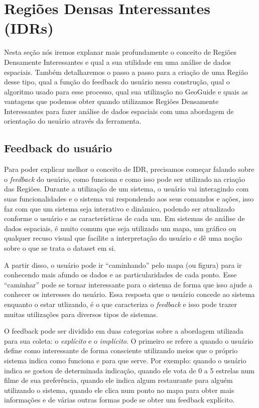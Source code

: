 \chapter{Regiões Densas Interessantes (IDRs)}


Nesta seção nós iremos explanar mais profundamente o conceito de Regiões Densamente Interessantes e qual a sua utilidade em uma análise de dados espaciais. Também detalharemos o passo a passo para a criação de uma Região desse tipo, qual a função do feedback do usuário nessa construção, qual o algoritmo usado para esse processo, qual sua utilização no GeoGuide e quais as vantagens que podemos obter quando utilizamos Regiões Densamente Interessantes para fazer análise de dados espaciais com uma abordagem de orientação do usuário através da ferramenta.

\section{Feedback do usuário}

Para poder explicar melhor o conceito de IDR, precisamos começar falando sobre o \textit{feedback} do usuário, como funciona e como isso pode ser utilizado na criação das Regiões. Durante a utilização de um sistema, o usuário vai interagindo com suas funcionalidades e o sistema vai respondendo aos seus comandos e ações, isso faz com que um sistema seja interativo e dinâmico, podendo ser atualizado conforme o usuário e as características de cada um. Em sistemas de análise de dados espaciais, é muito comum que seja utilizado um mapa, um gráfico ou qualquer recuso visual que facilite a interpretação do usuário e dê uma noção sobre o que se trata o dataset em si.

A partir disso, o usuário pode ir ``caminhando'' pelo mapa (ou figura) para ir conhecendo mais afundo os dados e as particularidades de cada ponto. Esse ``caminhar'' pode se tornar interessante para o sistema de forma que isso ajude a conhecer os interesses do usuário. Essa resposta que o usuário concede ao sistema enquanto o estar utlizando, é o que caracteriza o \textit{feedback} e isso pode trazer muitas utilizações para diversos tipos de sistemas.

O feedback pode ser dividido em duas categorias sobre a abordagem utilizada para sua coleta: o \textit{explícito} e o \textit{implícito}. O primeiro se refere a quando o usuário define como interessante de forma consciente utilizando meios que o próprio sistema indica como funciona e para que serve. Por exemplo: quando o usuário indica se gostou de determinada indicação, quando ele vota de 0 a 5 estrelas num filme de sua preferência, quando ele indica algum restaurante para alguém utilizando o sistema, quando ele clica num ponto no mapa para obter mais informações e de várias outras formas pode se obter um feedback explícito.

